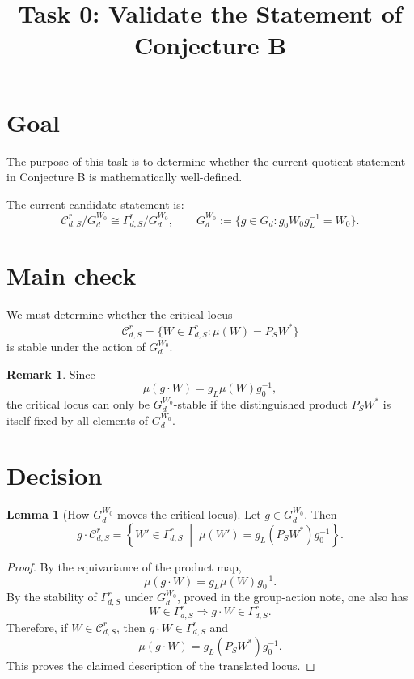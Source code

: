 \documentclass{article}
\title{Task 0: Validate the Statement of Conjecture B}
\date{}
\theoremstyle{definition}
\newtheorem{lemma}[theorem]{Lemma}
\newtheorem{remark}[theorem]{Remark}
\begin{document}
\maketitle

\section{Goal}

The purpose of this task is to determine whether the current quotient statement in Conjecture B is mathematically well-defined.

The current candidate statement is:
\[
\mathcal C_{d,S}^r / G_d^{W_0}
\cong
\Gamma_{d,S}^r / G_d^{W_0},
\qquad
G_d^{W_0}:=\{g\in G_d : g_0W_0g_L^{-1}=W_0\}.
\]

\section{Main check}

We must determine whether the critical locus
\[
\mathcal C_{d,S}^r
=
\{W\in \Gamma_{d,S}^r : \mu(W)=P_SW^\ast\}
\]
is stable under the action of $G_d^{W_0}$.

\begin{remark}
Since
\[
\mu(g\cdot W)=g_L\mu(W)g_0^{-1},
\]
the critical locus can only be $G_d^{W_0}$-stable if the distinguished product $P_SW^\ast$ is itself fixed by all elements of $G_d^{W_0}$.
\end{remark}

\section{Decision}

\begin{lemma}[How $G_d^{W_0}$ moves the critical locus]
Let $g\in G_d^{W_0}$. Then
\[
g\cdot \mathcal C_{d,S}^r
=
\left\{
W'\in \Gamma_{d,S}^r
\;\middle|\;
\mu(W')=g_L(P_SW^\ast)g_0^{-1}
\right\}.
\]
\end{lemma}

\begin{proof}
By the equivariance of the product map,
\[
\mu(g\cdot W)=g_L\mu(W)g_0^{-1}.
\]
By the stability of $\Gamma_{d,S}^r$ under $G_d^{W_0}$, proved in the group-action note, one also has
\[
W\in \Gamma_{d,S}^r \Longrightarrow g\cdot W\in \Gamma_{d,S}^r.
\]
Therefore, if $W\in \mathcal C_{d,S}^r$, then $g\cdot W\in \Gamma_{d,S}^r$ and
\[
\mu(g\cdot W)=g_L(P_SW^\ast)g_0^{-1}.
\]
This proves the claimed description of the translated locus.
\end{proof}
\end{document}
